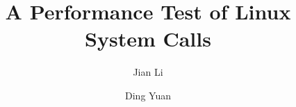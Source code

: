 \documentclass{article}
\begin{document}
\title{A Performance Test of Linux System Calls}
\author{Jian Li \and Ding Yuan}
\maketitle
\end{document}
